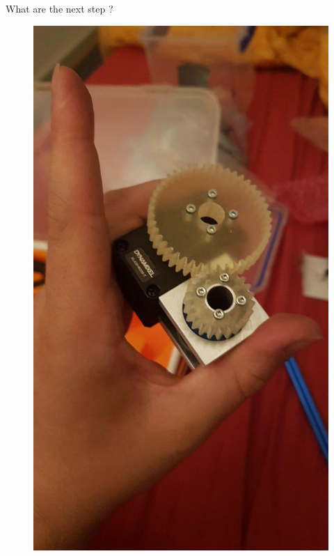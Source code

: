 \documentclass{beamer}
\begin{document}
\begin{frame}{What are the next step ?}
\begin{itemize}
\begin{figure}
\includegraphics[scale=0.3]{pictures/build2}
\end{figure}
\end{itemize}
\end{frame}
\end{document}
